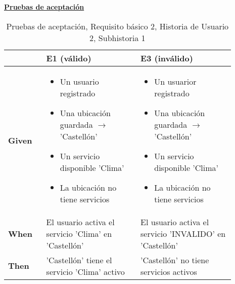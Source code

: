 \documentclass[../ei103948-project-documentation.tex]{subfiles}
\begin{document}
\begin{center}
					\textbf{\underline{Pruebas de aceptación}}
					\begin{table}[H]
						\centering
						\begin{tabular}{|p{0.15\linewidth}|p{0.37\linewidth}|p{0.37\linewidth}|}
							\hline
							\textbf{}      & \textbf{E1 (válido)}                                                                                                  & \textbf{E3 (inválido)}                                                                                                   \\ \hline
							\textbf{Given} & 
							\begin{itemize}\vspace{-5mm}\setlength\itemsep{0mm}\setlength\parskip{0mm}\setlength{\itemindent}{-5mm}
								\item Un usuario registrado
								\item Una ubicación guardada $\rightarrow$ 'Castellón'
								\item Un servicio disponible 'Clima'
								\item La ubicación no tiene servicios
							\end{itemize} & \begin{itemize}\vspace{-5mm}\setlength\itemsep{0mm}\setlength\parskip{0mm}\setlength{\itemindent}{-5mm}
								\item Un usuarior registrado
								\item Una ubicación guardada $\rightarrow$ 'Castellón'
								\item Un servicio disponible 'Clima'
								\item La ubicación no tiene servicios
							\end{itemize} \\ \hline
							\textbf{When}  & El usuario activa el servicio 'Clima' en 'Castellón'                                                                  & El usuario activa el servicio 'INVALIDO' en 'Castellón'                                                                  \\ \hline
							\textbf{Then}  & 'Castellón' tiene el servicio 'Clima' activo                                                                          & 'Castellón' no tiene servicios activos                                                                                   \\ \hline
							\end{tabular}
						\caption{Pruebas de aceptación, Requisito básico 2, Historia de Usuario 2, Subhistoria 1}
					\end{table}
					\end{center}
\end{document}
